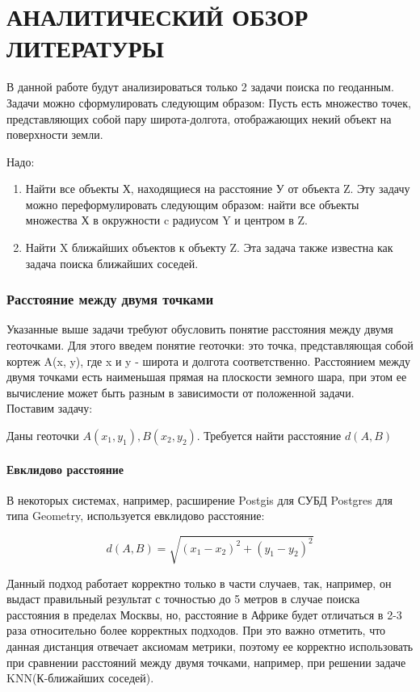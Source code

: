 \chapter{АНАЛИТИЧЕСКИЙ ОБЗОР ЛИТЕРАТУРЫ}
\label{cha:analysis}

В данной работе будут анализироваться только 2 задачи поиска по геоданным. Задачи можно сформулировать следующим образом:
Пусть есть множество точек, представляющих собой пару широта-долгота, отображающих некий объект на поверхности земли.

Надо:
\begin{enumerate}
    \item Найти все объекты Х, находящиеся на расстояние У от объекта Z. Эту задачу можно переформулировать следующим образом: найти все объекты множества Х в окружности c радиусом Y и центром в Z.
    \item Найти X ближайших объектов к объекту Z. Эта задача также известна как задача поиска ближайших соседей.
\end{enumerate}

\subsection{Расстояние между двумя точками}
Указанные выше задачи требуют обусловить понятие расстояния между двумя геоточками. Для этого введем понятие геоточки: это точка, представляющая собой кортеж A(x, y), где x и y - широта и долгота соответственно.
Расстоянием между двумя точками есть наименьшая прямая на плоскости земного шара, при этом ее вычисление может быть разным в зависимости от положенной задачи. \\
Поставим задачу:

Даны геоточки $A(x_1, y_1), B(x_2, y_2)$. Требуется найти расстояние $d(A, B)$

\subsubsection{Евклидово расстояние}
В некоторых системах, например, расширение Postgis для СУБД Postgres для типа Geometry, используется евклидово расстояние:

$$
d(A, B)=\sqrt{(x_1-x_2)^2+(y_1-y_2)^2}
$$

Данный подход работает корректно только в части случаев, так, например, он выдаст правильный результат с точностью до 5 метров в случае поиска расстояния в пределах Москвы, но, расстояние в Африке будет отличаться в 2-3 раза относительно более корректных подходов.
При это важно отметить, что данная дистанция отвечает аксиомам метрики, поэтому ее корректно использовать при сравнении расстояний между двумя точками, например, при решении задаче KNN(К-ближайших соседей).

